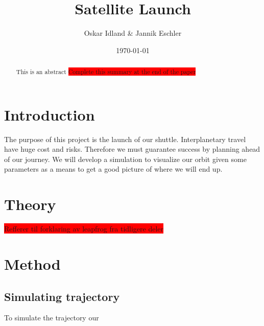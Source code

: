 \documentclass[reprint,english,notitlepage]{revtex4-2}
\begin{document}
\title{Satellite Launch}
\author{Oskar Idland \& Jannik Eschler}
\date{\today}

\begin{abstract}
    This is an abstract \colorbox{red}{Complete this summary at the end of the paper} 
\end{abstract}
\maketitle

\section{Introduction} \label{sec:introduction}
The purpose of this project is the launch of our shuttle.
Interplanetary travel have huge cost and risks.
Therefore we must guarantee success by planning ahead of our journey.
We will develop a simulation to visualize our orbit given some parameters as a means to get a good picture of where we will end up.

\section{Theory} \label{sec: theory}
\colorbox{red}{Refferer til forklaring av leapfrog fra tidligere deler}

\section{Method} \label{sec: method}
\subsection{Simulating trajectory} \label{ssec: simulating trajectory}
To simulate the trajectory our 
\end{document}
